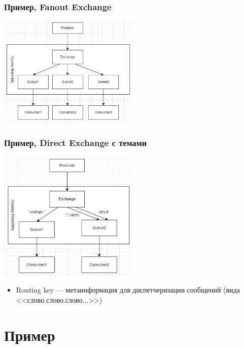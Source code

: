 \documentclass{../../slides-style}
\begin{document}
    \begin{frame}
        \frametitle{Пример, Fanout Exchange}
        \begin{center}
            \includegraphics[width=0.5\textwidth]{fanoutExchange.png}
        \end{center}
    \end{frame}

    \begin{frame}
        \frametitle{Пример, Direct Exchange с темами}
        \begin{center}
            \includegraphics[width=0.5\textwidth]{topicExchange.png}
        \end{center}
        \begin{itemize}
            \item Routing key --- метаинформация для диспетчеризации сообщений (вида <<слово.слово.слово...>>)
        \end{itemize}
    \end{frame}

    \section{Пример}
\end{document}

